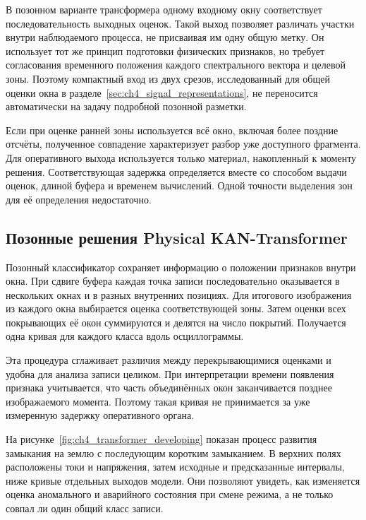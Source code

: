 В позонном варианте трансформера одному входному окну
соответствует последовательность выходных оценок.
Такой выход позволяет различать участки внутри
наблюдаемого процесса, не присваивая им одну общую метку.
Он использует тот же принцип подготовки физических
признаков, но требует согласования временного положения
каждого спектрального вектора и целевой зоны.
Поэтому компактный вход из двух срезов, исследованный
для общей оценки окна в разделе~\ref{sec:ch4_signal_representations},
не переносится автоматически на задачу подробной
позонной разметки.

Если при оценке ранней зоны используется всё окно,
включая более поздние отсчёты, полученное совпадение
характеризует разбор уже доступного фрагмента.
Для оперативного выхода используется только материал,
накопленный к моменту решения. Соответствующая задержка
определяется вместе со способом выдачи оценок,
длиной буфера и временем вычислений.
Одной точности выделения зон для её определения
недостаточно.

\subsection{Позонные решения Physical KAN-Transformer}
\label{sec:ch4_zonal_examples}

Позонный классификатор сохраняет информацию о положении
признаков внутри окна. При сдвиге буфера каждая точка
записи последовательно оказывается в нескольких окнах
и в разных внутренних позициях. Для итогового изображения
из каждого окна выбирается оценка соответствующей зоны.
Затем оценки всех покрывающих её окон суммируются
и делятся на число покрытий. Получается одна кривая
для каждого класса вдоль осциллограммы.

Эта процедура сглаживает различия между перекрывающимися
оценками и удобна для анализа записи целиком.
При интерпретации времени появления признака учитывается,
что часть объединённых окон заканчивается позднее
изображаемого момента. Поэтому такая кривая
не принимается за уже измеренную задержку оперативного органа.

На рисунке~\ref{fig:ch4_transformer_developing}
показан процесс развития замыкания на землю
с последующим коротким замыканием.
В верхних полях расположены токи и напряжения,
затем исходные и предсказанные интервалы,
ниже кривые отдельных выходов модели.
Они позволяют увидеть, как изменяется оценка
аномального и аварийного состояния при смене режима,
а не только совпал ли один общий класс записи.

